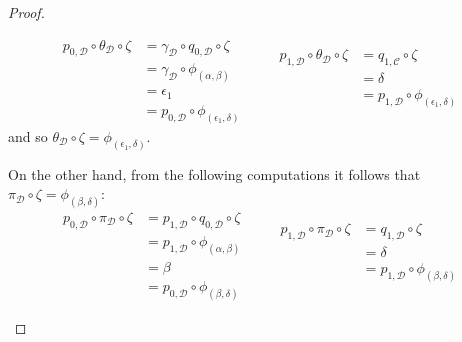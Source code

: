 \documentclass[a4paper,UKenglish,cleveref,pdftex,thm-restate,numberwithinsect]{lipics-v2021}
\begin{document}
\begin{proof}
\begin{enumerate}
\begin{itemize}
				\[\begin{split}
					p_{0, \mathcal{D}}\circ \theta_{\mathcal{D}}\circ \zeta &= \gamma_{\mathcal{D}}\circ q_{0, \mathcal{D}}\circ \zeta\\&=\gamma_{\mathcal{D}}\circ \phi_{(\alpha, \beta)}\\&=\epsilon_1\\&=p_{0, \mathcal{D}}\circ \phi_{(\epsilon_1, \delta)}
				\end{split} \qquad  \begin{split}p_{1, \mathcal{D}}\circ \theta_{\mathcal{D}} \circ \zeta &= q_{1, \mathcal{C}}\circ \zeta \\&=\delta\\&= p_{1, \mathcal{D}}\circ \phi_{(\epsilon_1, \delta)}\\&
				\end{split}\]
				and so $\theta_{\mathcal{D}} \circ \zeta =\phi_{(\epsilon_1, \delta)}$. 
				
				On the other hand, from the following computations it follows that $\pi_{\mathcal{D}}\circ \zeta=\phi_{(\beta, \delta)}$:
				\[\begin{split}
				p_{0, \mathcal{D}}\circ \pi_{\mathcal{D}}\circ \zeta&=p_{1, \mathcal{D}}\circ q_{0, \mathcal{D}}\circ \zeta\\&= p_{1, \mathcal{D}}\circ \phi_{(\alpha, \beta)}\\&=\beta\\&=p_{0, \mathcal{D}}\circ \phi_{(\beta, \delta)}
				\end{split}\qquad \begin{split}
				p_{1, \mathcal{D}}\circ \pi_{\mathcal{D}}\circ \zeta &= q_{1, \mathcal{D}}\circ \zeta\\&=\delta \\&= p_{1, \mathcal{D}}\circ \phi_{(\beta, \delta)}\\&
				\end{split}\]
				

\end{itemize}
\end{enumerate}
\end{proof}
\end{document}
